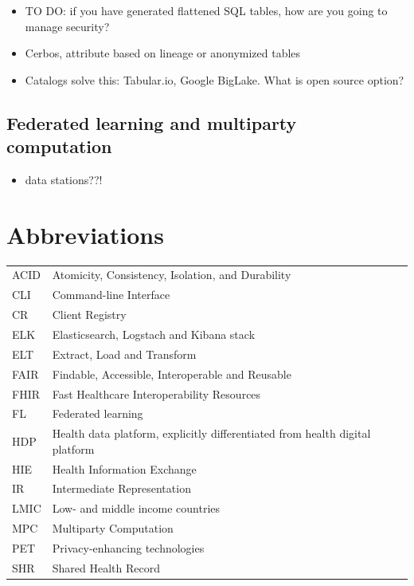 \documentclass[
  authoryear]{elsarticle}
\providecommand{\tightlist}{%
  \setlength{\itemsep}{0pt}\setlength{\parskip}{0pt}}\usepackage{longtable,booktabs,array}
\begin{document}
\begin{itemize}
\tightlist
\item
  TO DO: if you have generated flattened SQL tables, how are you going
  to manage security?
\item
  Cerbos, attribute based on lineage or anonymized tables
\item
  Catalogs solve this: Tabular.io, Google BigLake. What is open source
  option?
\end{itemize}

\subsection{Federated learning and multiparty
computation}\label{federated-learning-and-multiparty-computation}

\begin{itemize}
\tightlist
\item
  data stations??!
\end{itemize}

\section{Abbreviations}\label{abbreviations}

\begin{longtable}[]{@{}
  >{\raggedright\arraybackslash}p{}
  >{\raggedright\arraybackslash}p{}@{}}
\toprule\noalign{}
\endhead
\bottomrule\noalign{}
\endlastfoot
ACID & Atomicity, Consistency, Isolation, and Durability \\
CLI & Command-line Interface \\
CR & Client Registry \\
ELK & Elasticsearch, Logstach and Kibana stack \\
ELT & Extract, Load and Transform \\
FAIR & Findable, Accessible, Interoperable and Reusable \\
FHIR & Fast Healthcare Interoperability Resources \\
FL & Federated learning \\
HDP & Health data platform, explicitly differentiated from health
digital platform \\
HIE & Health Information Exchange \\
IR & Intermediate Representation \\
LMIC & Low- and middle income countries \\
MPC & Multiparty Computation \\
PET & Privacy-enhancing technologies \\
SHR & Shared Health Record \\
\end{longtable}


  
\end{document}
